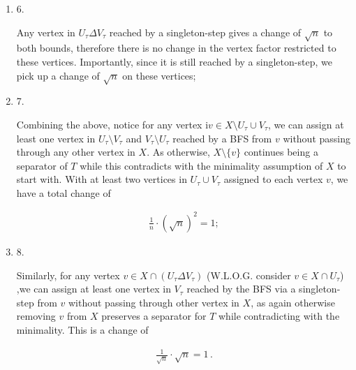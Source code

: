 \begin{enumerate}
\[\begin{gathered}
\frac{\sqrt{n}}{n}\cdot\sqrt{n}=1\,;
\end{gathered}\]





\item[] 
6. 


Any vertex in $U_{\tau}\Delta V_{\tau}$ reached by a singleton-step gives a change of $\sqrt{n}$ to both bounds, therefore there is no change in the vertex factor restricted to these vertices. Importantly, since it is still reached by a singleton-step, we pick up a change of $\sqrt{n}$ on these vertices;\par





\item[] 
7. 


Combining the above, notice for any vertex i$v\in X\setminus U_{\tau}\cup V_{\tau}$, we can assign at least one vertex in $U_{\tau}\setminus V_{\tau}$ and $V_{\tau}\setminus U_{\tau}$ reached by a BFS from $v$ without passing through any other vertex in $X$. As otherwise, $X\setminus\{v\}$ continues being a separator of $T$ while this contradicts with the minimality assumption of $X$ to start with. With at least two vertices in $U_{\tau}\cup V_{\tau}$ assigned to each vertex $v$, we have a total change of\par


\[\begin{gathered}
\frac{1}{n}\cdot(\sqrt{n})^{2}=1;
\end{gathered}\]





\item[] 
8. 


Similarly, for any vertex $v\in X\cap(U_{\tau}\Delta V_{\tau})$ (W.L.O.G. consider $v\in X\cap U_{\tau}$) ,we can assign at least one vertex in $V_{\tau}$ reached by the BFS via a singleton-step from $v$ without passing through other vertex in $X$, as again otherwise removing $v$ from $X$ preserves a separator for $T$ while contradicting with the minimality. This is a change of\par


\[\begin{gathered}
\frac{1}{\sqrt{n}}\cdot\sqrt{n}=1\,.
\end{gathered}\]





\end{enumerate}


